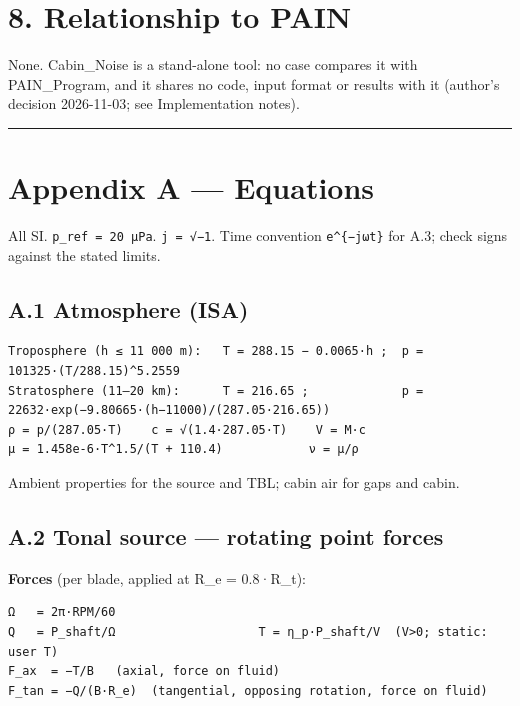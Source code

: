 \documentclass[10pt,a4paper]{article}
\begin{document}
\section*{8. Relationship to PAIN}

None. Cabin\_Noise is a stand-alone tool: no case compares it with PAIN\_Program, and it shares no code, input format or results with it (author's decision 2026-11-03; see Implementation notes).

\noindent\rule{\linewidth}{0.4pt}

\section*{Appendix A — Equations}

All SI. \texttt{p\_\allowbreak{}ref = 20 µPa}. \texttt{j = √−1}. Time convention \texttt{e\textasciicircum{}\{−jωt\}} for A.3; check signs against the stated limits.

\subsection*{A.1 Atmosphere (ISA)}

\begin{Verbatim}[breaklines,fontsize=\small,frame=single,rulecolor=\color{gray}]
Troposphere (h ≤ 11 000 m):   T = 288.15 − 0.0065·h ;  p = 101325·(T/288.15)^5.2559
Stratosphere (11–20 km):      T = 216.65 ;             p = 22632·exp(−9.80665·(h−11000)/(287.05·216.65))
ρ = p/(287.05·T)    c = √(1.4·287.05·T)    V = M·c
μ = 1.458e-6·T^1.5/(T + 110.4)            ν = μ/ρ
\end{Verbatim}

Ambient properties for the source and TBL; cabin air for gaps and cabin.

\subsection*{A.2 Tonal source — rotating point forces}

\textbf{Forces} (per blade, applied at R\_e = 0.8·R\_t):

\begin{Verbatim}[breaklines,fontsize=\small,frame=single,rulecolor=\color{gray}]
Ω   = 2π·RPM/60
Q   = P_shaft/Ω                    T = η_p·P_shaft/V  (V>0; static: user T)
F_ax  = −T/B   (axial, force on fluid)
F_tan = −Q/(B·R_e)  (tangential, opposing rotation, force on fluid)
\end{Verbatim}
\end{document}
